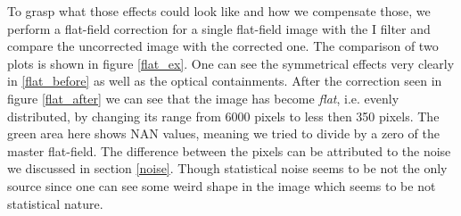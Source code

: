 To grasp what those effects could look like and how we compensate those, we perform a flat-field correction for a single flat-field image with the I filter and compare the uncorrected image with the corrected one. The comparison of two plots is shown in figure \ref{flat_ex}. One can see the symmetrical effects very clearly in \ref{flat_before} as well as the optical containments. After the correction seen in figure \ref{flat_after} we can see that the image has become \textit{flat}, i.e. evenly distributed, by changing its range from 6000 pixels to less then 350 pixels. The green area here shows NAN values, meaning we tried to divide by a zero of the master flat-field. The difference between the pixels can be attributed to the noise we discussed in section \ref{noise}. Though statistical noise seems to be not the only source since one can see some weird shape in the image which seems to be not statistical nature. 
\vspace{4mm}\\
